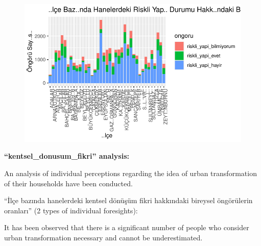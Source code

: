 \documentclass[
  11pt,
  a4paper,
  DIV=11,
  numbers=noendperiod]{scrartcl}
\newenvironment{Shaded}{\begin{snugshade}}{\end{snugshade}}
\newcommand{\AttributeTok}[1]{\textcolor[rgb]{0.40,0.45,0.13}{#1}}
\newcommand{\FunctionTok}[1]{\textcolor[rgb]{0.28,0.35,0.67}{#1}}
\newcommand{\NormalTok}[1]{\textcolor[rgb]{0.00,0.23,0.31}{#1}}
\newcommand{\OtherTok}[1]{\textcolor[rgb]{0.00,0.23,0.31}{#1}}
\newcommand{\SpecialCharTok}[1]{\textcolor[rgb]{0.37,0.37,0.37}{#1}}
\begin{document}
\begin{figure}[H]

{\centering \includegraphics{project_files/figure-pdf/unnamed-chunk-12-1.pdf}

}

\end{figure}

\textbf{``kentsel\_donusum\_fikri'' analysis:}

An analysis of individual perceptions regarding the idea of urban
transformation of their households have been conducted.

``İlçe bazında hanelerdeki kentsel dönüşüm fikri hakkındaki bireysel
öngörülerin oranları'' (2 types of individual foresights):

It has been observed that there is a significant number of people who
consider urban transformation necessary and cannot be underestimated.

\begin{Shaded}
\end{Shaded}
\end{document}
